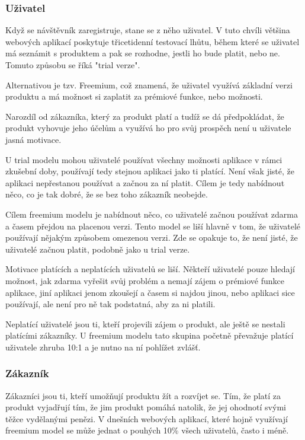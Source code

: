 \documentclass[bc,female,java,dept456]{diploma}						%
\begin{document}
\subsubsection{Uživatel}

Když se návštěvník zaregistruje, stane se z něho uživatel. V tuto chvíli většina webových aplikací poskytuje třicetidenní testovací lhůtu, během které se uživatel má seznámit s produktem a pak se rozhodne, jestli ho bude platit, nebo ne. Tomuto způsobu se říká "trial verze".

Alternativou je tzv. Freemium, což znamená, že uživatel využívá základní verzi produktu a má možnost si zaplatit za prémiové funkce, nebo možnosti.

Narozdíl od zákazníka, který za produkt platí a tudíž se dá předpokládat, že produkt vyhovuje jeho účelům a využívá ho pro svůj prospěch není u uživatele jasná motivace. 

U trial modelu mohou uživatelé používat všechny možnosti aplikace v rámci zkušební doby, používají tedy stejnou aplikaci jako ti platící. Není však jisté, že aplikaci nepřestanou používat a začnou za ní platit. Cílem je tedy nabídnout něco, co je tak dobré, že se bez toho zákazník neobejde.

Cílem freemium modelu je nabídnout něco, co uživatelé začnou používat zdarma a časem přejdou na placenou verzi. Tento model se liší hlavně v tom, že uživatelé používají nějakým způsobem omezenou verzi. Zde se opakuje to, že není jisté, že uživatelé začnou platit, podobně jako u trial verze.

Motivace platících a neplatících uživatelů se liší. Někteří uživatelé pouze hledají možnost, jak zdarma vyřešit svůj problém a nemají zájem o prémiové funkce aplikace, jiní aplikaci jenom zkoušejí a časem si najdou jinou, nebo aplikaci sice používají, ale není pro ně tak podstatná, aby za ni platili.

Neplatící uživatelé jsou ti, kteří projevili zájem o produkt, ale ještě se nestali platícími zákazníky. U freemium modelu tato skupina početně převažuje platící uživatele zhruba 10:1 a je nutno na ní pohlížet zvlášť.

\subsubsection{Zákazník}

Zákazníci jsou ti, kteří umožňují produktu žít a rozvíjet se. Tím, že platí za produkt vyjadřují tím, že jim produkt pomáhá natolik, že jej ohodnotí svými těžce vydělanými penězi. V dnešních webových aplikací, které hojně využívají freemium model se může jednat o pouhých 10\% všech uživatelů, často i méně. 
\end{document}
